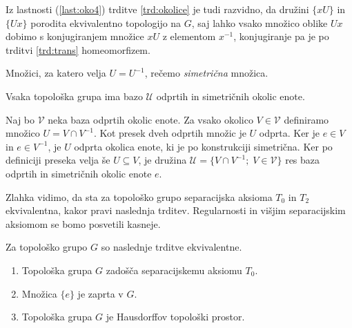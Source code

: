 \documentclass[mat1]{fmfdelo}
\newcommand{\Ucurl}{\mathcal{U}}
\begin{document}
\begin{dokaz}
Iz lastnosti (\ref{last:oko4}) trditve \ref{trd:okolice} je tudi razvidno, da družini $\lbrace xU \rbrace$ in $\lbrace Ux \rbrace$ porodita ekvivalentno topologijo na $G$, saj lahko vsako množico oblike $Ux$ dobimo s konjugiranjem množice $xU$ z elementom $x^{-1}$, konjugiranje pa je po trditvi \ref{trd:trans} homeomorfizem.
\end{dokaz}

\begin{definicija}\label{def:sim}
Množici, za katero velja $U = U^{-1}$, rečemo \emph{simetrična} množica.
\end{definicija}

\begin{trditev}\label{trd:sim}
Vsaka topološka grupa ima bazo $\Ucurl$ odprtih in simetričnih okolic enote.
\end{trditev}

\begin{dokaz}
Naj bo $\mathcal{V}$ neka baza odprtih okolic enote. Za vsako okolico $V \in \mathcal{V}$ definiramo množico $U = V \cap V^{-1}$. Kot presek dveh odprtih množic je $U$ odprta. Ker je $e \in V$ in $e \in V^{-1}$, je $U$ odprta okolica enote, ki je po konstrukciji simetrična. Ker po definiciji preseka velja še $U \subseteq V$, je družina $\Ucurl = \lbrace V \cap V^{-1} ;\; V \in \mathcal{V} \rbrace$ res baza odprtih in simetričnih okolic enote $e$.
\end{dokaz}

Zlahka vidimo, da sta za topološko grupo separacijska aksioma $T_0$ in $T_2$ ekvivalentna, kakor pravi naslednja trditev. Regularnosti in višjim separacijskim aksiomom se bomo posvetili kasneje.
\begin{trditev}\label{trd:t0haus}
Za topološko grupo $G$ so naslednje trditve ekvivalentne.
\begin{enumerate}
	\item Topološka grupa $G$ zadošča separacijskemu aksiomu $T_0$.\label{podtrd:h1}
	\item Množica $\lbrace e \rbrace$ je zaprta v $G$.\label{podtrd:h2}
	\item Topološka grupa $G$ je Hausdorffov topološki prostor.\label{podtrd:h3}
\end{enumerate}
\end{trditev}
\end{document}
